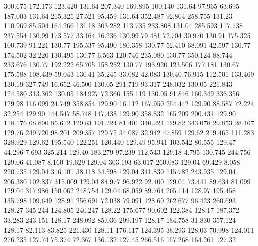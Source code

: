  300.675  172.173  123.420       131.64
 207.340  169.895  100.140       131.64
  97.965   63.695  187.003       131.64
 215.325   27.521   95.459       131.64
 352.487   92.804  258.755       131.23
 110.969   85.504  164.266       131.18
 303.282  113.735  233.808       131.04
 285.593  117.738  237.554       130.99
 173.577   33.164   16.236       130.99
  79.481   72.704   30.970       130.91
 175.325  100.739   91.221       130.77
 195.537   95.490  180.358       130.77
  52.410   68.091   42.597       130.77
 174.502   32.220  130.495       130.77
   6.563  120.746  235.080       130.77
 350.124   88.744  233.676       130.77
 192.222   65.705  158.252       130.77
 193.920  123.506  177.181       130.67
 175.588  108.439   59.043       130.41
  35.245   33.082   42.083       130.40
  76.915  112.501  133.469       130.19
 327.749   16.652   46.500       130.05
 291.719   93.317  248.032       130.05
 221.843  124.580  313.362       130.05
 184.927   72.366  155.119       130.05
  91.846  160.349  336.356       129.98
 116.099   24.749  358.854       129.90
  16.112  167.950  254.442       129.90
  88.587   72.224   32.254       129.90
 144.547   58.748  147.438       129.90
 358.832  165.209  200.431       129.90
 118.176   68.890   86.612       129.83
 191.224   81.401  340.224       129.82
 343.078   29.853   28.167       129.76
 249.720   98.201  209.357       129.75
  34.087   32.942   47.859       129.62
 219.465  111.283  328.929       129.62
 195.540  122.251  120.440       129.49
  95.941  103.542   80.555       129.47
  44.296    7.693  325.214       129.40
 183.279   97.239  112.543       129.18
   4.795  130.745  244.756       129.06
  41.087    8.160   19.629       129.04
 303.193   63.017  260.083       129.04
  69.429    8.058  220.735       129.04
 316.101   38.118   34.598       129.04
 341.830  115.782  243.935       129.04
 206.380  102.837  315.009       129.04
  84.977   96.922   92.400       129.04
  73.441   89.634   81.099       129.04
 317.986  150.062  248.754       129.04
  68.059   89.764  205.114       128.97
 195.458  135.798  109.649       128.91
 256.691   72.038   79.091       128.60
 262.677   96.423  260.693       128.27
 345.244  124.805  240.247       128.22
 175.677   90.602  122.384       128.17
 187.372   33.283  243.151       128.17
 248.092   85.036  299.197       128.17
 184.758   31.830  357.124       128.17
  82.113   83.825  221.430       128.11
 176.117  124.395   38.293       128.03
  70.998  124.011  276.235       127.74
  75.374   72.367  136.132       127.45
 266.516  157.268  164.261       127.32
